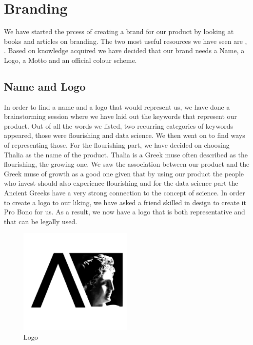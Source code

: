 \documentclass[main.tex]{subfiles}
\begin{document}
\section{Branding}
We have started the prcess of creating a brand for our product by looking at books and articles on branding. The two most useful resources we have seen are  \cite{basics_branding}, \cite{clifton_2009}. Based on knowledge acquired we have decided that our brand needs a Name,  a Logo, a Motto and an official colour scheme. 
\subsection{Name and Logo}
In order to find a name and a logo that would represent us, we have done a brainstorming session where we have laid out the keywords that represent our product. Out of all the words we listed, two recurring categories of keywords appeared, those were flourishing and data science. We then went on to find ways of representing those. For the flourishing part, we have decided on choosing Thalia as the name of the product. Thalia is a Greek muse often described as the flourishing, the growing one. We saw the association between our product and the Greek muse of growth as a good one given that by using our product the people who invest should also experience flourishing and for the data science part  the Ancient Greeks have a very strong connection to the concept of science. \newline\newline
In order to create a logo to our liking, we have asked a friend skilled in design to create it Pro Bono for us. As a result, we now have a logo that is both representative and that can be legally used.


\begin{figure}[H]
    \centering
    \caption{Logo \cite{TR}}
    \includegraphics[width=0.5\textwidth]{Pictures/small_logo.png}
\end{figure}
\end{document}
